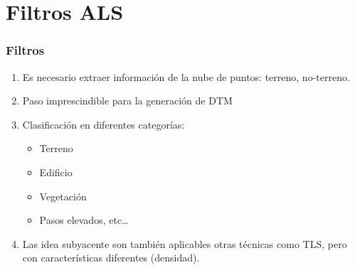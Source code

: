 \section[Filtros]{Filtros ALS}
\begin{frame}
  \frametitle{Filtros}
  \begin{enumerate}
    \item Es necesario extraer información de la nube de puntos: terreno,
      no-terreno.
    \item Paso imprescindible para la generación de DTM
    \item Clasificación en diferentes categorías:
      \begin{itemize}
        \item Terreno
        \item Edificio
        \item Vegetación
        \item Pasos elevados, etc\ldots
      \end{itemize}
    \item Las idea subyacente son también aplicables otras técnicas como TLS,
      pero con características diferentes (densidad).
  \end{enumerate}
\end{frame}
